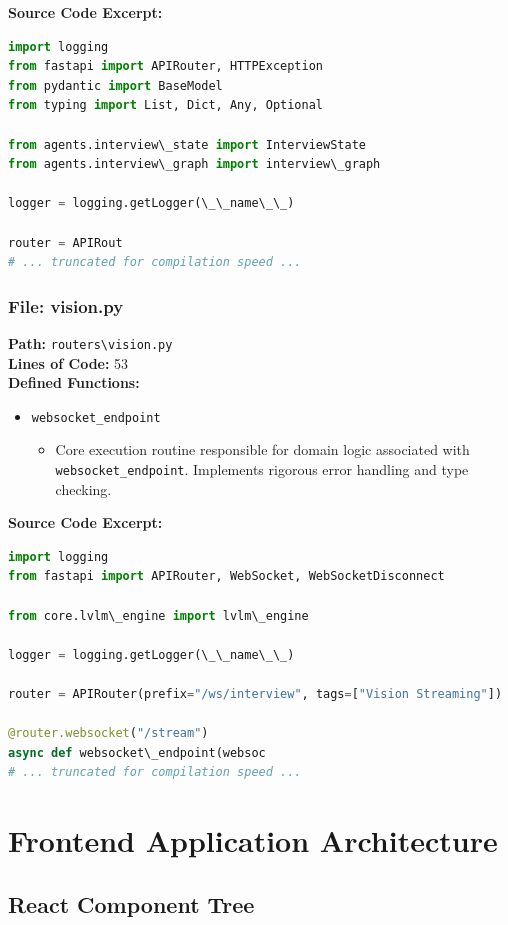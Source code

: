 \documentclass[10pt,journal,compsoc]{IEEEtran}
\begin{document}
\textbf{Source Code Excerpt:}
\begin{lstlisting}[language=Python]
import logging
from fastapi import APIRouter, HTTPException
from pydantic import BaseModel
from typing import List, Dict, Any, Optional

from agents.interview\_state import InterviewState
from agents.interview\_graph import interview\_graph

logger = logging.getLogger(\_\_name\_\_)

router = APIRout
# ... truncated for compilation speed ...
\end{lstlisting}

\subsubsection{File: vision.py}
\textbf{Path:} \texttt{routers\textbackslash{}vision.py} \\
\textbf{Lines of Code:} 53 \\
\textbf{Defined Functions:}
\begin{itemize}
    \item \texttt{websocket\_endpoint}
    \begin{itemize} \item Core execution routine responsible for domain logic associated with \texttt{websocket\_endpoint}. Implements rigorous error handling and type checking. \end{itemize}
\end{itemize}
\textbf{Source Code Excerpt:}
\begin{lstlisting}[language=Python]
import logging
from fastapi import APIRouter, WebSocket, WebSocketDisconnect

from core.lvlm\_engine import lvlm\_engine

logger = logging.getLogger(\_\_name\_\_)

router = APIRouter(prefix="/ws/interview", tags=["Vision Streaming"])

@router.websocket("/stream")
async def websocket\_endpoint(websoc
# ... truncated for compilation speed ...
\end{lstlisting}


\section{Frontend Application Architecture}\label{sec:frontend_detailed}
\subsection{React Component Tree}
\end{document}
